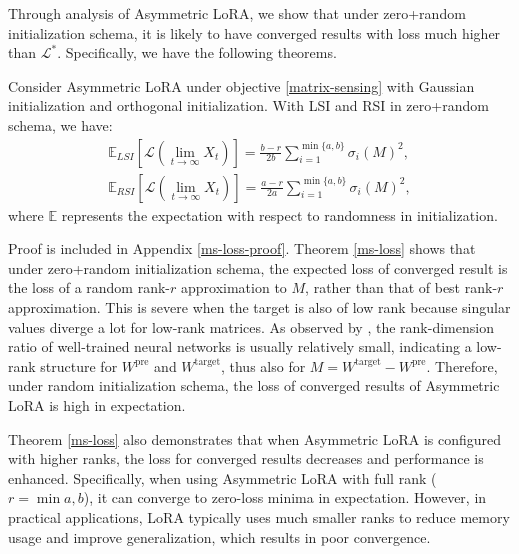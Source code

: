 Through analysis of Asymmetric LoRA, we show that under zero+random initialization schema, it is likely to have converged results with loss much higher than $\mathcal{L}^*$. 
Specifically, we have the following theorems. 
\begin{theorem}
    \label{ms-loss}
    Consider Asymmetric LoRA under objective \ref{matrix-sensing} with Gaussian initialization and orthogonal initialization. With LSI and RSI in zero+random schema, we have:
    \begin{align*}
        \mathbb{E}_{LSI}\left[\mathcal{L}(\lim_{t\to\infty}X_t)\right]=\frac{b-r}{2b}\sum_{i=1}^{\min\{a,b\}}\sigma_i(M)^2,\\
        \mathbb{E}_{RSI}\left[\mathcal{L}(\lim_{t\to\infty}X_t)\right]=\frac{a-r}{2a}\sum_{i=1}^{\min\{a,b\}}\sigma_i(M)^2,
    \end{align*}
    where $\mathbb{E}$ represents the expectation with respect to randomness in initialization. 
\end{theorem}
Proof is included in Appendix \ref{ms-loss-proof}. Theorem \ref{ms-loss} shows that under zero+random initialization schema, the expected loss of converged result is the loss of a random rank-$r$ approximation to $M$, rather than that of best rank-$r$ approximation. 
This is severe when the target is also of low rank because singular values diverge a lot for low-rank matrices. As observed by \citet{wang2023cuttlefish}, the rank-dimension ratio of well-trained neural networks is usually relatively small, indicating a low-rank structure for $W^{\operatorname{pre}}$ and $W^{\operatorname{target}}$, thus also for $M=W^{\operatorname{target}}-W^{\operatorname{pre}}$. Therefore, under random initialization schema, the loss of converged results of Asymmetric LoRA is high in expectation. 

Theorem \ref{ms-loss} also demonstrates that when Asymmetric LoRA is configured with higher ranks, the loss for converged results decreases and performance is enhanced. 
Specifically, when using Asymmetric LoRA with full rank ($r=\min{a,b}$), it can converge to zero-loss minima in expectation. However, in practical applications, LoRA typically uses much smaller ranks to reduce memory usage and improve generalization, which results in poor convergence. 

